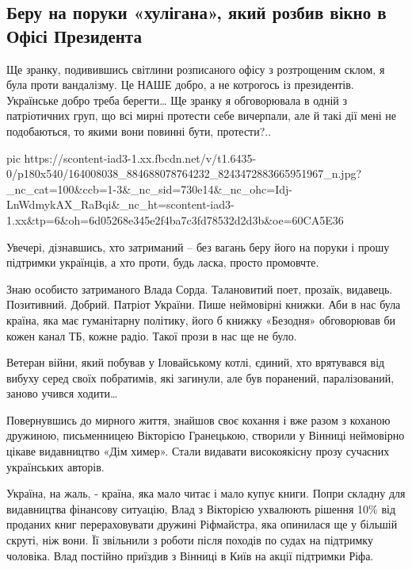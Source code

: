  
 
 
 
 
\subsection{Беру на поруки «хулігана», який розбив вікно в Офісі Президента}
\label{sec:22_03_2021.fb.nicoj_larisa.1.huligan_vlad_sord}

Ще зранку, подивившись світлини розписаного офісу з розтрощеним склом, я була
проти вандалізму. Це НАШЕ добро, а не котрогось із президентів. Українське
добро треба берегти… Ще зранку я обговорювала в одній з патріотичних груп, що
всі мирні протести себе вичерпали, але й такі дії мені не подобаються, то якими
вони повинні бути, протести?..

\ifcmt
  pic https://scontent-iad3-1.xx.fbcdn.net/v/t1.6435-0/p180x540/164008038_884688078764232_8243472883665951967_n.jpg?_nc_cat=100&ccb=1-3&_nc_sid=730e14&_nc_ohc=Idj-LnWdmykAX_RaBqi&_nc_ht=scontent-iad3-1.xx&tp=6&oh=6d05268e345e2f4ba7c3fd78532d2d3b&oe=60CA5E36
\fi

Увечері, дізнавшись, хто затриманий – без вагань беру його на поруки і прошу
підтримки українців, а хто проти, будь ласка, просто промовчте. 

Знаю особисто затриманого Влада Сорда. Талановитий поет, прозаїк, видавець.
Позитивний. Добрий. Патріот України. Пише неймовірні книжки. Аби в нас була
країна, яка має гуманітарну політику, його б книжку «Безодня» обговорював би
кожен канал ТБ, кожне радіо. Такої прози в нас ще не було. 

Ветеран війни, який побував у Іловайському котлі, єдиний, хто врятувався від
вибуху серед своїх побратимів, які загинули, але був поранений, паралізований,
заново учився ходити… 

Повернувшись до мирного життя, знайшов своє кохання і вже разом з коханою
дружиною, письменницею Вікторією Гранецькою, створили у Вінниці неймовірно
цікаве видавництво «Дім химер». Стали видавати високоякісну прозу сучасних
українських авторів.

Україна, на жаль, - країна, яка мало читає і мало купує книги. Попри складну
для видавництва фінансову ситуацію, Влад з Вікторією ухвалюють рішення 10\% від
проданих книг перераховувати дружині Ріфмайстра, яка опинилася ще у більшій
скруті, ніж вони. Її звільнили з роботи після  походів по судах на підтримку
чоловіка. Влад постійно приїздив з Вінниці в Київ на акції підтримки Ріфа.

